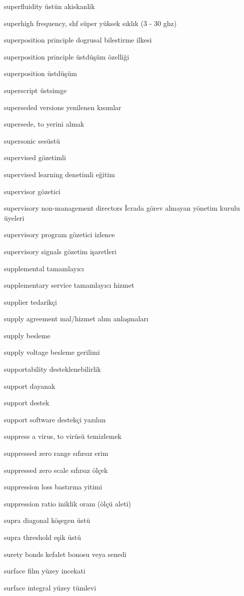 \documentclass[12pt,fleqn]{article}\usepackage{../../common}
\begin{document}
superfluidity üstün akiskanlik

superhigh frequency, shf süper yüksek sıklık (3 - 30 ghz)

superposition principle dogrusal bilestirme ilkesi

superposition principle üstdüşüm özelliği

superposition üstdüşüm

superscript üstsimge

superseded versions yenilenen kısımlar

supersede, to yerini almak

supersonic sesüstü

supervised gözetimli

supervised learning denetimli eğitim

supervisor gözetici

supervisory non-management directors İcrada görev almayan yönetim kurulu üyeleri

supervisory program gözetici izlence

supervisory signals gözetim işaretleri

supplemental tamamlayıcı

supplementary service tamamlayıcı hizmet

supplier tedarikçi

supply agreement mal/hizmet alım anlaşmaları

supply besleme

supply voltage besleme gerilimi

supportability desteklenebilirlik

support dayanak

support destek

support software destekçi yazılım

suppress a virus, to virüsü temizlemek

suppressed zero range sıfırsız erim

suppressed zero scale sıfırsız ölçek

suppression loss bastırma yitimi

suppression ratio iniklik oranı (ölçü aleti)

supra diagonal köşegen üstü

supra threshold eşik üstü

surety bonds kefalet bonosu veya senedi

surface film yüzey incekati

surface integral yüzey tümlevi
\end{document}
